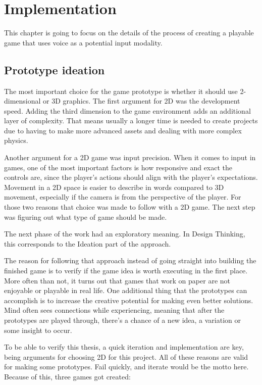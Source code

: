 \chapter{Implementation}

\label{ch:implementation}

This chapter is going to focus on the details of the process of creating a playable game that uses voice as a potential input modality.

\section{Prototype ideation}

The most important choice for the game prototype is whether it should use 2-dimensional or 3D graphics. 
The first argument for 2D was the development speed.
Adding the third dimension to the game environment adds an additional layer of complexity. That means usually a longer time is needed to create projects due to having to make more advanced assets and dealing with more complex physics.

Another argument for a 2D game was input precision.
When it comes to input in games, one of the most important factors is how responsive and exact the controls are, since the player's actions should align with the player's expectations. Movement in a 2D space is easier to describe in words compared to 3D movement, especially if the camera is from the perspective of the player.
For those two reasons that choice was made to follow with a 2D game. The next step was figuring out what type of game should be made.

The next phase of the work had an exploratory meaning. In Design Thinking, this corresponds to the Ideation part of the \textcite{DoubleDiamondDesign2005} approach.

The reason for following that approach instead of going straight into building the finished game is to verify if the game idea is worth executing in the first place. More often than not, it turns out that games that work on paper are not enjoyable or playable in real life.
One additional thing that the prototypes can accomplish is to increase the creative potential for making even better solutions.
Mind often sees connections while experiencing, meaning that after the prototypes are played through, there's a chance of a new idea, a variation or some insight to occur. 

To be able to verify this thesis, a quick iteration and implementation are key, being arguments for choosing 2D for this project.
All of these reasons are valid for making some prototypes. Fail quickly, and iterate would be the motto here. 
Because of this, three games got created:

